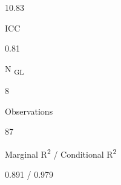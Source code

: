 \documentclass[
  letterpaper,
  DIV=11,
  numbers=noendperiod]{scrartcl}
\begin{document}
\begin{table}
\begin{minipage}[t]{\linewidth}
{\centering 

10.83

}

\end{minipage}%
\newline
\begin{minipage}[t]{\linewidth}

{\centering 

ICC

}

\end{minipage}%
\newline
\begin{minipage}[t]{\linewidth}

{\centering 

0.81

}

\end{minipage}%
\newline
\begin{minipage}[t]{\linewidth}

{\centering 

N \textsubscript{GL}

}

\end{minipage}%
\newline
\begin{minipage}[t]{\linewidth}

{\centering 

8

}

\end{minipage}%
\newline
\begin{minipage}[t]{\linewidth}

{\centering 

Observations

}

\end{minipage}%
\newline
\begin{minipage}[t]{\linewidth}

{\centering 

87

}

\end{minipage}%
\newline
\begin{minipage}[t]{\linewidth}

{\centering 

Marginal R\textsuperscript{2} / Conditional R\textsuperscript{2}

}

\end{minipage}%
\newline
\begin{minipage}[t]{\linewidth}

{\centering 

0.891 / 0.979

}

\end{minipage}%

\end{table}
\end{document}
